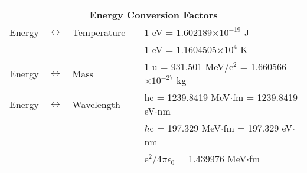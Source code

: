 \pagebreak
\begin{table}[t]
  \centering
  \begin{tabular}{r c l c l}
    \multicolumn{5}{c}{\Large Energy Conversion Factors}\\
    \hline\hline
    Energy \T& $\leftrightarrow$ & Temperature & & 1 eV = 1.602189$\times10^{-19}$ J\\[4pt]
                                         & & & & 1 eV = 1.1604505$\times10^4$ K\\[4pt]
    Energy & $\leftrightarrow$ & Mass        & & 1 u = 931.501 MeV/c$^2$ = 1.660566$\times10^{-27}$ kg\\[4pt]
    Energy & $\leftrightarrow$ & Wavelength  & & hc = 1239.8419 MeV$\cdot$fm = 1239.8419 eV$\cdot$nm\\[4pt]
                                         & & & & $\hbar$c = 197.329 MeV$\cdot$fm = 197.329 eV$\cdot$nm\\
                                         & \B& & & e$^2$/4$\pi\epsilon_0$ = 1.439976 MeV$\cdot$fm\\
    \hline
    \end{tabular}
  \label{table:conversion}
\end{table}


